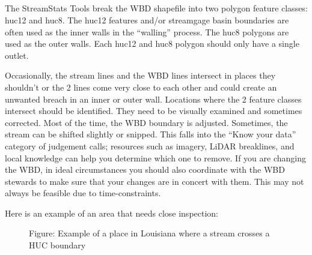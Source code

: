 \documentclass[letterpaper,10pt,english]{sphinxmanual}
\begin{document}
\paragraph{}
\label{\detokenize{ex_1:step-4-nhd-wbd-conflicts}}

\subparagraph{}
\label{\detokenize{ex_1:overview}}
The StreamStats Tools break the WBD shapefile into two polygon feature classes: huc12 and huc8. The huc12 features and/or streamgage basin boundaries are often used as the inner walls in the “walling” process. The huc8 polygons are used as the outer walls. Each huc12 and huc8 polygon should only have a single outlet.

Occasionally, the stream lines and the WBD lines intersect in places they shouldn’t or the 2 lines come very close to each other and could create an unwanted breach in an inner or outer wall.  Locations where the 2 feature classes intersect should be identified. They need to be visually examined and sometimes corrected. Most of the time, the WBD boundary is adjusted. Sometimes, the stream can be shifted slightly or snipped. This falls into the “Know your data” category of judgement calls; resources such as imagery, LiDAR breaklines, and local knowledge can help you determine which one to remove. If you are changing the WBD, in ideal circumstances you should also coordinate with the WBD stewards to make sure that your changes are in concert with them. This may not always be feasible due to time-constraints.

Here is an example of an area that needs close inspection:

\begin{figure}[htbp]
\centering
\capstart

\noindent{}
\caption{Figure: Example of a place in Louisiana where a stream crosses a HUC boundary}\label{\detokenize{ex_1:id13}}\end{figure}
\end{document}
